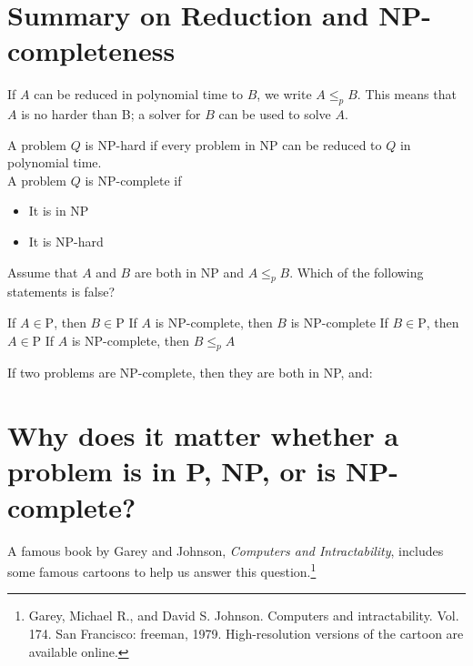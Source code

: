 \documentclass[11  pt]{article}
\begin{document}
	
	\section{Summary on Reduction and NP-completeness}
	If $A$ can be reduced in polynomial time to $B$, we write $A \leq_p B$. This means that $A$ is no harder than B; a solver for $B$ can be used to solve $A$.\\
	
	\vs{2cm}
	\vfill
	
	A problem $Q$ is NP-hard if every problem in NP can be reduced to $Q$ in polynomial time. \\
	
	A problem $Q$ is NP-complete if
	\begin{itemize}
		\item It is in NP
		\item It is NP-hard\\
	\end{itemize}
	
	\vfill
	
	
	\begin{Qu}
		Assume that $A$ and $B$ are both in NP and $A \leq_p B$. Which of the following statements is false?
		\begin{itemize}
			\aitem If $A \in \text{P}$, then $B \in \text{P}$
			\bitem If $A$ is NP-complete, then $B$ is NP-complete
			\citem If $B \in \text{P}$, then $A \in \text{P}$
			\ditem If $A$ is NP-complete, then $B \leq_p A$
		\end{itemize}
	\end{Qu}
	\vs{1cm}
	
	If two problems are NP-complete, then they are both in NP, and:
	
	\vs{1cm}
	
	\newpage
	
	\section{Why does it matter whether a problem is in P, NP, or is NP-complete?}
	
	A famous book by Garey and Johnson, \emph{Computers and Intractability}, includes some famous cartoons to help us answer this question.\footnote{Garey, Michael R., and David S. Johnson. Computers and intractability. Vol. 174. San Francisco: freeman, 1979. High-resolution versions of the cartoon are available online. }\\
	
\end{document}
